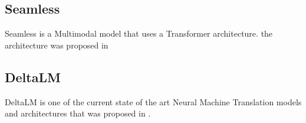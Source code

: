\subsection{Seamless}
Seamless is a Multimodal model that uses a Transformer architecture. 
the architecture was proposed in \cite{communication2023seamlessm4t} 

\subsection{DeltaLM}
DeltaLM is one of the current state of the art Neural Machine Translation models and architectures that was proposed in \cite{ma2021deltalm}. 
